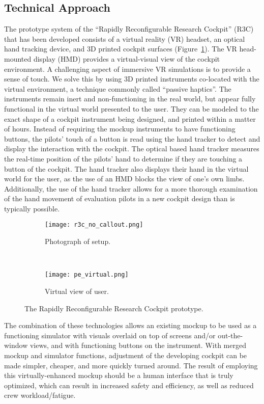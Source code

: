 \subsection{Technical Approach}

The prototype system of the ``Rapidly Reconfigurable Research Cockpit'' (R3C) that has been developed consists of a virtual reality (VR) headset, an optical hand tracking device, and 3D printed cockpit surfaces (Figure~\ref{fig:intro_r3c}).
The VR head-mounted display (HMD) provides a virtual-visual view of the cockpit environment.
A challenging aspect of immersive VR simulations is to provide a sense of touch.
We solve this by using 3D printed instruments co-located with the virtual environment, a technique commonly called ``passive haptics''.
 The instruments remain inert and non-functioning in the real world, but appear fully functional in the virtual world presented to the user.
They can be modeled to the exact shape of a cockpit instrument being designed, and printed within a matter of hours.
Instead of requiring the mockup instruments to have functioning buttons, the pilots' touch of a button is read using the hand tracker to detect and display the interaction with the cockpit.
The optical based hand tracker measures the real-time position of the pilots' hand to determine if they are touching a button of the cockpit.
The hand tracker also displays their hand in the virtual world for the user, as the use of an HMD blocks the view of one's own limbs.
Additionally, the use of the hand tracker allows for a more thorough examination of the hand movement of evaluation pilots in a new cockpit design than is typically possible.

\begin{figure}
    \centering
    \begin{subfigure}[t]{0.95\linewidth}
        \centering
        \texttt{[image: r3c\_no\_callout.png]}
        \caption{Photograph of setup.}
    \end{subfigure}\\
    \begin{subfigure}[t]{0.95\linewidth}
        \centering
        \texttt{[image: pe\_virtual.png]}
        \caption{Virtual view of user.}
    \end{subfigure}
    \caption{The Rapidly Reconfigurable Research Cockpit prototype.}
    \label{fig:intro_r3c}
\end{figure}

The combination of these technologies allows an existing mockup to be used as a functioning simulator with visuals overlaid on top of screens and/or out-the-window views, and with functioning buttons on the instrument.
With merged mockup and simulator functions, adjustment of the developing cockpit can be made simpler, cheaper, and more quickly turned around.
The result of employing this virtually-enhanced mockup should be a human interface that is truly optimized, which can result in increased safety and efficiency, as well as reduced crew workload/fatigue.

